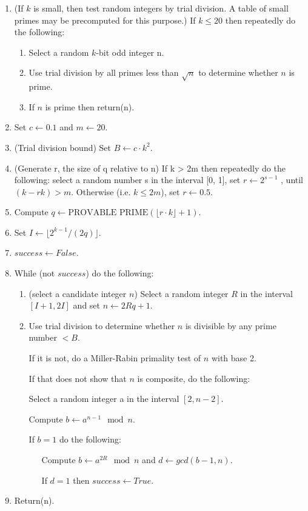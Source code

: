 \documentclass[11pt,a4paper]{article}
\begin{document}
\begin{enumerate}
\item (If $k$ is small, then test random integers by trial division. A table of small primes may 
be precomputed for this purpose.) 
If $k \leq 20$ then repeatedly do the following: 
\begin{enumerate}
\item Select a random $k$-bit odd integer n. 
\item Use trial division by all primes less than $\sqrt{n}$ to determine whether $n$ is prime. 
\item If $n$ is prime then return(n).
\end{enumerate}
\item Set $c\leftarrow 0.1$ and $m\leftarrow 20$. 
\item (Trial division bound) Set $B\leftarrow c \cdot k^2$. 
\item (Generate r, the size of q relative to n) If k > 2m then repeatedly 
do the following: select a random number s in the interval [0, 1], set $r\leftarrow 2^{s-1}$ , until 
$(k - rk) > m$. Otherwise (i.e. $k \leq 2m$), set $r\leftarrow 0.5$. 
\item Compute $q\leftarrow \text{PROVABLE PRIME}(\lfloor r \cdot k \rfloor + 1)$. 
\item Set $I \leftarrow \lfloor 2^{k-1} /(2q) \rfloor$. 
\item $success\leftarrow False$. 
\item While (not $success$) do the following:
  \begin{enumerate}
\item (select a candidate integer $n$) Select a random integer $R$ in the interval 
$[I + 1, 2I]$ and set $n\leftarrow 2Rq + 1$. 
\item Use trial division to determine whether $n$ is divisible by any prime number $< B$.

If it is not, do a Miller-Rabin primality test of $n$ with base 2.

If that does not show that $n$ is composite, do the following: 

Select a random integer a in the interval $[2, n - 2]$. 

Compute $b\leftarrow a^{n-1} \mod n$. 

If $b = 1$ do the following: 

\ \ \ Compute $b\leftarrow a^{2R} \mod n$ and $d\leftarrow  gcd(b - 1, n)$.

\ \ \ If $d = 1$ then $success\leftarrow True$.
\end{enumerate} 
\item Return(n). 
\end{enumerate}
\end{document}
